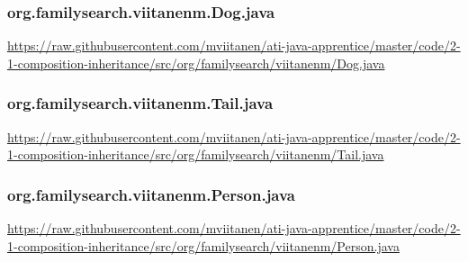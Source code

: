 \vspace{1em}
\subsubsection*{org.familysearch.viitanenm.Dog.java}
\noindent
\begin{minipage}{.6in}
\end{minipage}
\begin{minipage}{6in}
  \url{https://raw.githubusercontent.com/mviitanen/ati-java-apprentice/master/code/2-1-composition-inheritance/src/org/familysearch/viitanenm/Dog.java}
\end{minipage}

\vspace{1em}
\subsubsection*{org.familysearch.viitanenm.Tail.java}
\noindent
\begin{minipage}{.6in}
\end{minipage}
\begin{minipage}{6in}
  \url{https://raw.githubusercontent.com/mviitanen/ati-java-apprentice/master/code/2-1-composition-inheritance/src/org/familysearch/viitanenm/Tail.java}
\end{minipage}

\vspace{1em}
\subsubsection*{org.familysearch.viitanenm.Person.java}
\noindent
\begin{minipage}{.6in}
\end{minipage}
\begin{minipage}{6in}
  \url{https://raw.githubusercontent.com/mviitanen/ati-java-apprentice/master/code/2-1-composition-inheritance/src/org/familysearch/viitanenm/Person.java}
\end{minipage}

